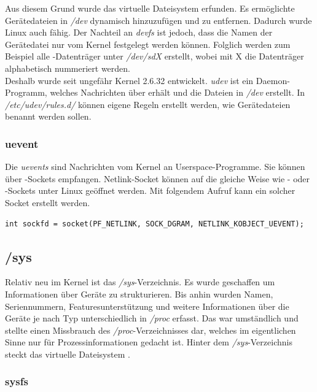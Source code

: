 Aus diesem Grund wurde das virtuelle Dateisystem  erfunden. Es ermöglichte Gerätedateien in \emph{/dev} dynamisch hinzuzufügen und zu entfernen.
Dadurch wurde Linux auch  fähig. Der Nachteil an \emph{devfs} ist jedoch, dass die Namen der Gerätedatei nur vom Kernel festgelegt werden
können. Folglich werden zum Beispiel alle -Datenträger unter \emph{/dev/sdX} erstellt, wobei mit X die Datenträger alphabetisch nummeriert werden. \\

Deshalb wurde seit ungefähr Kernel 2.6.32  entwickelt. \emph{udev} ist ein Daemon-Programm, welches Nachrichten über  erhält 
und die Dateien in \emph{/dev} erstellt. In \emph{/etc/udev/rules.d/} können eigene Regeln erstellt werden, wie Gerätedateien benannt werden sollen.

\subsubsection{uevent}

Die \emph{uevents} sind Nachrichten vom Kernel an Userspace-Programme. Sie können über -Sockets empfangen. Netlink-Socket können auf die gleiche Weise
wie - oder -Sockets unter Linux geöffnet werden. Mit folgendem Aufruf kann ein solcher Socket erstellt werden.
\begin{lstlisting}
int sockfd = socket(PF_NETLINK, SOCK_DGRAM, NETLINK_KOBJECT_UEVENT);
\end{lstlisting}

\subsection{/sys}

Relativ neu im Kernel ist das \emph{/sys}-Verzeichnis. Es wurde geschaffen um Informationen über Geräte zu strukturieren. Bis anhin wurden Namen, Seriennummern, Featuresunterstützung 
und weitere Informationen über die Geräte je nach Typ unterschiedlich in \emph{/proc} erfasst. Das war umständlich und stellte einen Missbrauch des \emph{/proc}-Verzeichnisses dar, welches
im eigentlichen Sinne nur für Prozessinformationen gedacht ist. Hinter dem \emph{/sys}-Verzeichnis steckt das virtuelle Dateisystem .

\subsubsection{sysfs}

